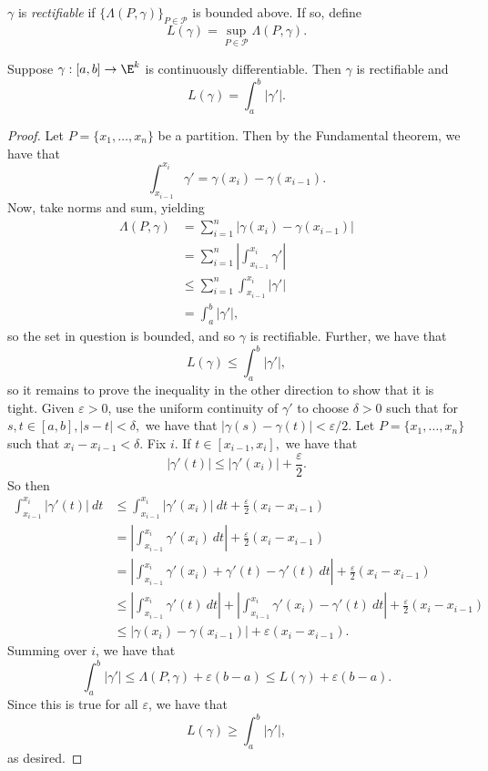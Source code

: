 \documentclass{notes}
\begin{document}
\begin{defn}[Rectifiable]
  $\gamma$ is \emph{rectifiable} if $\{\Lambda(P, \gamma)\}_{P\in \mathcal{P}}$ is bounded above. If 
  so, define 
  $$L(\gamma) = \sup_{P\in\mathcal{P}} \Lambda(P, \gamma).$$
\end{defn}

\begin{theorem}
  Suppose $\gamma: [a,b] \to \E^k$ is continuously differentiable. Then $\gamma$ is rectifiable and 
  $$L(\gamma) = \int_a^b |\gamma'|.$$
\end{theorem}
\begin{proof}
  Let $P = \{x_1, \ldots, x_n \}$ be a partition. Then by the Fundamental theorem, we have that 
  $$\int_{x_{i-1}}^{x_i} \gamma' = \gamma(x_i) - \gamma(x_{i-1}).$$
  Now, take norms and sum, yielding
  \begin{align*}
    \Lambda(P, \gamma) &= \sum_{i=1}^n |\gamma(x_i) - \gamma(x_{i-1})| \\
                       &= \sum_{i=1}^n |\int_{x_{i-1}}^{x_i} \gamma'| \\ 
                       &\leq \sum_{i=1}^n \int_{x_{i-1}}^{x_i} |\gamma'| \\
                       &= \int_a^b |\gamma'|,
  \end{align*}
  so the set in question is bounded, and so $\gamma$ is rectifiable. Further, we have that 
  $$L(\gamma) \leq \int_a^b |\gamma'|,$$
  so it remains to prove the inequality in the other direction to show that it is tight. Given
  $\varepsilon > 0$, use the uniform continuity of $\gamma'$ to choose $\delta > 0$ such that for 
  $s,t\in [a,b], |s-t| < \delta,$ we have that $|\gamma(s) - \gamma(t)| < \varepsilon / 2$. Let $P =
  \{x_1, \ldots, x_n \}$ such that $x_i - x_{i-1} < \delta$. Fix $i$. If $t\in[x_{i-1}, x_i],$ we
  have that 
  $$|\gamma'(t)| \leq |\gamma'(x_i)| + \frac{\varepsilon}{2}.$$
  So then
  \begin{align*}
    \int_{x_{i-1}}^{x_i} |\gamma'(t)|\ dt &\leq \int_{x_{i-1}}^{x_i} |\gamma'(x_i)|\ dt +
    \frac{\varepsilon}{2} (x_i - x_{i-1}) \\
    &= \left|\int_{x_{i-1}}^{x_i} \gamma'(x_i)\ dt\right| + \frac{\varepsilon}{2} (x_i - x_{i-1}) \\
    &= \left|\int_{x_{i-1}}^{x_i} \gamma'(x_i) + \gamma'(t) - \gamma'(t)\ dt\right| +
    \frac{\varepsilon}{2}(x_i - x_{i-1}) \\
    &\leq \left|\int_{x_{i-1}}^{x_i} \gamma'(t)\ dt\right| + \left|\int_{x_{i-1}}^{x_i} \gamma'(x_i) - \gamma'(t)\ dt\right| +
    \frac{\varepsilon}{2}(x_i - x_{i-1}) \\
    &\leq |\gamma(x_i) - \gamma(x_{i-1})| + \varepsilon(x_i - x_{i-1}).
  \end{align*}
  Summing over $i$, we have that 
  $$\int_a^b |\gamma'| \leq \Lambda(P, \gamma) + \varepsilon(b-a) \leq L(\gamma) + \varepsilon(b-a).$$
  Since this is true for all $\varepsilon$, we have that 
  $$L(\gamma) \geq \int_a^b |\gamma'|,$$
  as desired.
\end{proof}
\end{document}
